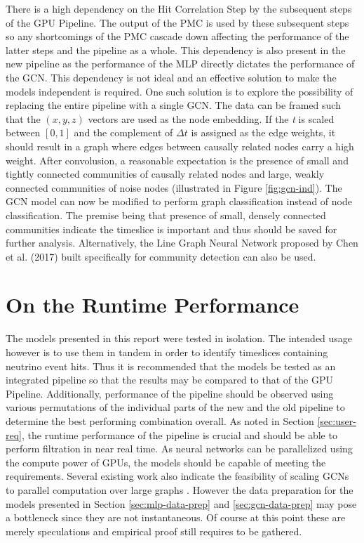 There is a high dependency on the Hit Correlation Step by the
subsequent steps of the GPU Pipeline. The output of the PMC is used by
these subsequent steps so any shortcomings of the PMC cascade down
affecting the performance of the latter steps and the pipeline as a
whole. This dependency is also present in the new pipeline as the
performance of the MLP directly dictates the performance of the GCN.
This dependency is not ideal and an effective solution to make the
models independent is required. One such solution is to explore the
possibility of replacing the entire pipeline with a single GCN. The
data can be framed such that the $(x, y, z)$ vectors are used as the
node embedding. If the \emph{t} is scaled between $[0, 1]$ and the
complement of $\Delta t$ is assigned as the edge weights, it should
result in a graph where edges between causally related nodes carry a
high weight. After convolusion, a reasonable expectation is the
presence of small and tightly connected communities of causally
related nodes and large, weakly connected communities of noise nodes
(illustrated in Figure \ref{fig:gcn-ind}). The GCN model can now be
modified to perform graph classification \cite{zhang2018end} instead
of node classification. The premise being that presence of small,
densely connected communities indicate the timeslice is important and
thus should be saved for further analysis. Alternatively, the Line
Graph Neural Network proposed by Chen et al. (2017) built specifically
for community detection can also be used.

\section{On the Runtime Performance}
The models presented in this report were tested in isolation. The
intended usage however is to use them in tandem in order to identify
timeslices containing neutrino event hits. Thus it is recommended that
the models be tested as an integrated pipeline so that the results may
be compared to that of the GPU Pipeline. Additionally, performance of
the pipeline should be observed using various permutations of the
individual parts of the new and the old pipeline to determine the best
performing combination overall. As noted in Section
\ref{sec:user-req}, the runtime performance of the pipeline is crucial
and should be able to perform filtration in near real time. As neural
networks can be parallelized using the compute power of GPUs, the
models should be capable of meeting the requirements. Several existing
work also indicate the feasibility of scaling GCNs to parallel
computation over large graphs \cite{ma2019high, ma2019neugraph,
  zeng2019accurate}. However the data preparation for the models
presented in Section \ref{sec:mlp-data-prep} and
\ref{sec:gcn-data-prep} may pose a bottleneck since they are not
instantaneous. Of course at this point these are merely speculations
and empirical proof still requires to be gathered.

